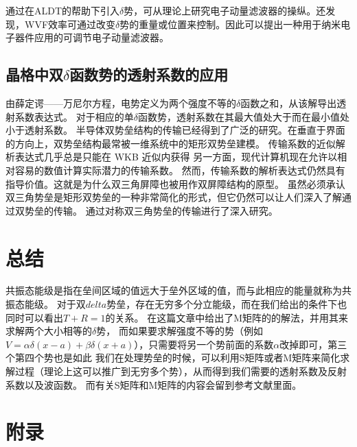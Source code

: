 \documentclass[12pt, a4paper, oneside]{ctexart}
\begin{document}
\begin{spacing}{2.0}
通过在ALDT的帮助下引入$\delta$势，可从理论上研究电子动量滤波器的操纵。还发现，WVF效率可通过改变$\delta$势的重量或位置来控制。因此可以提出一种用于纳米电子器件应用的可调节电子动量滤波器。
	
\subsection{晶格中双$\delta$函数势的透射系数的应用}
\cite{YANETKA1999371}由薛定谔——万尼尔方程，电势定义为两个强度不等的$\delta$函数之和，从该解导出透射系数表达式。  对于相应的单$\delta$函数势，透射系数在其最大值处大于而在最小值处小于透射系数。
半导体双势垒结构的传输已经得到了广泛的研究。在垂直于界面的方向上，双势垒结构最常被一维系统中的矩形双势垒建模。
传输系数的近似解析表达式几乎总是只能在 WKB 近似内获得
另一方面，现代计算机现在允许以相对容易的数值计算实际潜力的传输系数。
然而，传输系数的解析表达式仍然具有指导价值。这就是为什么双三角屏障也被用作双屏障结构的原型。
虽然必须承认双三角势垒是矩形双势垒的一种非常简化的形式，但它仍然可以让人们深入了解通过双势垒的传输。
通过对称双三角势垒的传输进行了深入研究。
\section{总结}
共振态能级是指在垒间区域的值远大于垒外区域的值，而与此相应的能量就称为共振态能级。
对于双$delta$势垒，存在无穷多个分立能级，而在我们给出的条件下也同时可以看出$T+R=1$的关系。
在这篇文章中给出了M矩阵的的解法，并用其来求解两个大小相等的$\delta$势，
而如果要求解强度不等的势（例如$V=\alpha \delta(x-a)+\beta \delta(x+a)$），只需要将另一个势前面的系数$\alpha$改掉即可，第三个第四个势也是如此
我们在处理势垒的时候，可以利用S矩阵或者M矩阵来简化求解过程（理论上这可以推广到无穷多个势），从而得到我们需要的透射系数及反射系数以及波函数。
而有关S矩阵\cite{enwiki:1074717524}和M矩阵\cite{RN03}的内容会留到参考文献里面。
\newpage
\section{附录}

\end{spacing}
\end{document}
